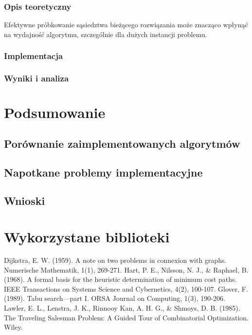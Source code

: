 \documentclass[12pt,a4paper]{article}
\begin{document}
\subsubsection{Opis teoretyczny}
Efektywne próbkowanie sąsiedztwa bieżącego rozwiązania może znacząco wpłynąć na wydajność algorytmu, szczególnie dla dużych instancji problemu.

\subsubsection{Implementacja}

\subsubsection{Wyniki i analiza}

\section{Podsumowanie}
\subsection{Porównanie zaimplementowanych algorytmów}

\subsection{Napotkane problemy implementacyjne}

\subsection{Wnioski}

\section{Wykorzystane biblioteki}

\begin{thebibliography}{9}
     Dijkstra, E. W. (1959). A note on two problems in connexion with graphs. Numerische Mathematik, 1(1), 269-271.
     Hart, P. E., Nilsson, N. J., & Raphael, B. (1968). A formal basis for the heuristic determination of minimum cost paths. IEEE Transactions on Systems Science and Cybernetics, 4(2), 100-107.
     Glover, F. (1989). Tabu search—part I. ORSA Journal on Computing, 1(3), 190-206.
     Lawler, E. L., Lenstra, J. K., Rinnooy Kan, A. H. G., & Shmoys, D. B. (1985). The Traveling Salesman Problem: A Guided Tour of Combinatorial Optimization. Wiley.
\end{thebibliography}
\end{document}
